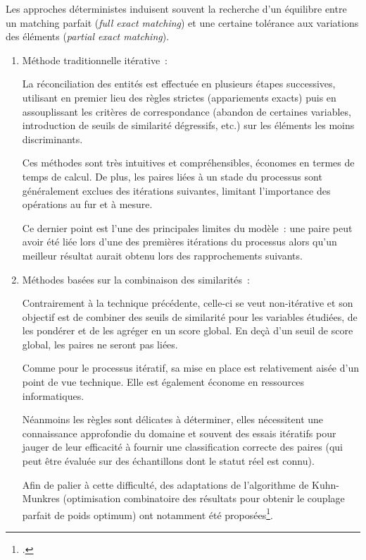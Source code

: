 \documentclass[a4paper,12pt,twoside]{book}
\begin{document}
			        Les approches déterministes induisent souvent la recherche d'un équilibre entre un matching parfait (\textit{full exact matching}) et une certaine tolérance aux variations des éléments (\textit{partial exact matching}).

    			    \begin{enumerate}
    			        \item  Méthode traditionnelle itérative~:
    			        
    			        La réconciliation des entités est effectuée en plusieurs étapes successives, utilisant en premier lieu des règles strictes (appariements exacts) puis en assouplissant les critères de correspondance (abandon de certaines variables, introduction de seuils de similarité dégressifs, etc.) sur les éléments les moins discriminants.
    			        
    			        Ces méthodes sont très intuitives et compréhensibles, économes en termes de temps de calcul. De plus, les paires liées à un stade du processus sont généralement exclues des itérations suivantes, limitant l'importance des opérations au fur et à mesure.
    			        
    			        Ce dernier point est l'une des principales limites du modèle~: une paire peut avoir été liée lors d'une des premières itérations du processus alors qu'un meilleur résultat aurait obtenu lors des rapprochements suivants.
    			        
    			        \pagebreak
    			        
    			        \item Méthodes basées sur la combinaison des similarités~:
    			        
    			        Contrairement à la technique précédente, celle-ci se veut non-itérative et son objectif est de combiner des seuils de similarité pour les variables étudiées, de les pondérer et de les agréger en un score global. En deçà d'un seuil de score global, les paires ne seront pas liées.
    			        
    			        Comme pour le processus itératif, sa mise en place est relativement aisée d'un point de vue technique. Elle est également économe en ressources informatiques.
    			        
    			        Néanmoins les règles sont délicates à déterminer, elles nécessitent une connaissance approfondie du domaine et souvent des essais itératifs pour jauger de leur efficacité à fournir une classification correcte des paires (qui peut être évaluée sur des échantillons dont le statut réel est connu).
    			        
    			        Afin de palier à cette difficulté, des adaptations de l'algorithme de Kuhn-Munkres (optimisation combinatoire des résultats pour obtenir le couplage parfait de poids optimum) ont notamment été proposées\footcites[Voir~:][]{}{guhaMergingResultsApproximate2004,AlgorithmeHongrois2022}.
    			        
    			    \end{enumerate}
			    
\end{document}
